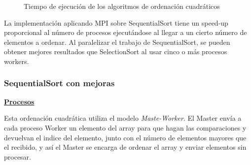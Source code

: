 		\newpage
		
		\begin{figure}[!h]
			\centering
			\caption{Tiempo de ejecución de los algoritmos de ordenación cuadráticos}
		\end{figure}
		
		La implementación aplicando MPI sobre SequentialSort tiene un speed-up proporcional al número de procesos ejecutándose al llegar a un cierto número de elementos a ordenar.  %
		Al paralelizar el trabajo de SequentialSort, se pueden obtener mejores resultados que SelectionSort al usar cinco o más procesos workers.
		
		\subsubsection{SequentialSort con mejoras}
		
		\begin{flushleft}
		\begin{mdframed}[roundcorner=5pt]		
			\textbf{\underline{Procesos}}
			\vspace{0.1cm}
			
			\scriptsize	
			Esta ordenación cuadrática utiliza el modelo \textit{Maste-Worker}. El Master envía a cada proceso Worker un elemento del array para que hagan las comparaciones y devuelvan el indice del elemento, junto con el número de elementos mayores que el recibido, y así el Master se encarga de ordenar el array y enviar elementos sin procesar.							
		\end{mdframed}
		\end{flushleft}	
		
